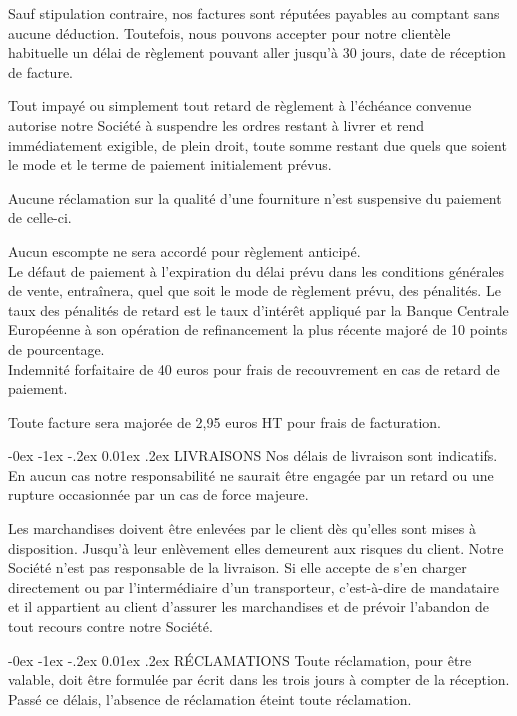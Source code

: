 \documentclass[a4paper, oneside, 10pt, french]{article}
\makeatletter
\renewcommand{\section}{\@startsection {section}{1}{\z@}%
             {-0ex \@plus -1ex \@minus -.2ex}%
             {0.01ex \@plus.2ex}%
             {\normalfont\normalsize\sffamily}}
\makeatother
\begin{document}
\begin{multicols}{2}
\begin{small}
Sauf stipulation contraire, nos factures sont réputées payables au comptant sans aucune déduction. Toutefois, nous pouvons accepter pour notre clientèle habituelle un délai de règlement pouvant aller jusqu'à 30 jours, date de réception de facture.

Tout impayé ou simplement tout retard de règlement à l'échéance convenue autorise notre Société à suspendre les ordres restant à livrer et rend immédiatement exigible, de plein droit, toute somme restant due quels que soient le mode et le terme de paiement initialement prévus.

Aucune réclamation sur la qualité d'une fourniture n'est suspensive du paiement de celle-ci.

Aucun escompte ne sera accordé pour règlement anticipé.\\
Le défaut de paiement à l'expiration du délai prévu dans les conditions générales de vente, entraînera, quel que soit le mode de règlement prévu, des pénalités. Le taux des pénalités de retard est le taux d'intérêt appliqué par la Banque Centrale Européenne à son opération de refinancement la plus récente majoré de 10 points de pourcentage.\\
Indemnité forfaitaire de 40 euros pour frais de recouvrement en cas de retard de paiement.

Toute facture sera majorée de 2,95 euros HT pour frais de facturation. 

\section{LIVRAISONS}
Nos délais de livraison sont indicatifs. En aucun cas notre responsabilité ne saurait être engagée par un retard ou une rupture occasionnée par un cas de force majeure.

Les marchandises doivent être enlevées par le client dès qu'elles sont mises à disposition. Jusqu'à leur enlèvement elles demeurent aux risques du client. Notre Société n'est pas responsable de la livraison. Si elle accepte de s'en charger directement ou par l'intermédiaire d'un transporteur, c'est-à-dire de mandataire et il appartient au client d'assurer les marchandises et de prévoir l'abandon de tout recours contre notre Société.

\section{RÉCLAMATIONS}
Toute réclamation, pour être valable, doit être formulée par écrit dans les trois jours à compter de la réception. Passé ce délais, l'absence de réclamation éteint toute réclamation.


\end{small}
\end{multicols}
\end{document}
